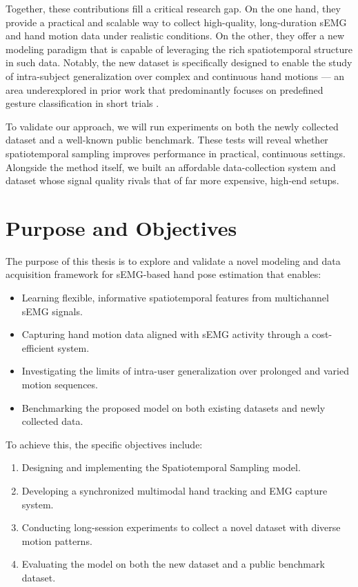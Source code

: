 Together, these contributions fill a critical research gap. On the one hand, they provide a practical and scalable way to collect high-quality, long-duration sEMG and hand motion data under realistic conditions. On the other, they offer a new modeling paradigm that is capable of leveraging the rich spatiotemporal structure in such data. Notably, the new dataset is specifically designed to enable the study of intra-subject generalization over complex and continuous hand motions — an area underexplored in prior work that predominantly focuses on predefined gesture classification in short trials \cite{salter2024emg2pose}.

To validate our approach, we will run experiments on both the newly collected dataset and a well-known public benchmark. These tests will reveal whether spatiotemporal sampling improves performance in practical, continuous settings. Alongside the method itself, we built an affordable data-collection system and dataset whose signal quality rivals that of far more expensive, high-end setups.

\section{Purpose and Objectives}

The purpose of this thesis is to explore and validate a novel modeling and data acquisition framework for sEMG-based hand pose estimation that enables:
\begin{itemize}
    \item Learning flexible, informative spatiotemporal features from multichannel sEMG signals.
    \item Capturing hand motion data aligned with sEMG activity through a cost-efficient system.
    \item Investigating the limits of intra-user generalization over prolonged and varied motion sequences.
    \item Benchmarking the proposed model on both existing datasets and newly collected data.
\end{itemize}

To achieve this, the specific objectives include:
\begin{enumerate}
    \item Designing and implementing the Spatiotemporal Sampling model.
    \item Developing a synchronized multimodal hand tracking and EMG capture system.
    \item Conducting long-session experiments to collect a novel dataset with diverse motion patterns.
    \item Evaluating the model on both the new dataset and a public benchmark dataset.
\end{enumerate}

